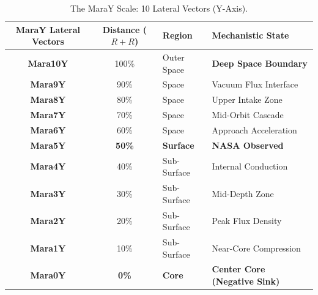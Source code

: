 \documentclass[11pt, a4paper]{article}
\begin{document}
\begin{table}[!ht]
  \centering
  \begin{tabular}{c c l l} 
    \toprule
    \textbf{MaraY Lateral Vectors} & \textbf{Distance ($R+R$)} & \textbf{Region} & \textbf{Mechanistic State} \\
    \midrule
    \textbf{Mara10Y} & 100\% & Outer Space & \textbf{Deep Space Boundary} \\
    \textbf{Mara9Y} & 90\% & Space & Vacuum Flux Interface \\
    \textbf{Mara8Y} & 80\% & Space & Upper Intake Zone \\
    \textbf{Mara7Y} & 70\% & Space & Mid-Orbit Cascade \\
    \textbf{Mara6Y} & 60\% & Space & Approach Acceleration \\
    \midrule
    \textbf{Mara5Y} & \textbf{50\%} & \textbf{Surface} & \textbf{NASA Observed} \\
    \midrule
    \textbf{Mara4Y} & 40\% & Sub-Surface & Internal Conduction \\
    \textbf{Mara3Y} & 30\% & Sub-Surface & Mid-Depth Zone \\
    \textbf{Mara2Y} & 20\% & Sub-Surface & Peak Flux Density \\
    \textbf{Mara1Y} & 10\% & Sub-Surface & Near-Core Compression \\
    \textbf{Mara0Y} & \textbf{0\%} & \textbf{Core} & \textbf{Center Core (Negative Sink)} \\
    \bottomrule
  \end{tabular}
  \caption{The MaraY Scale: 10 Lateral Vectors (Y-Axis).}
\end{table}
\end{document}

